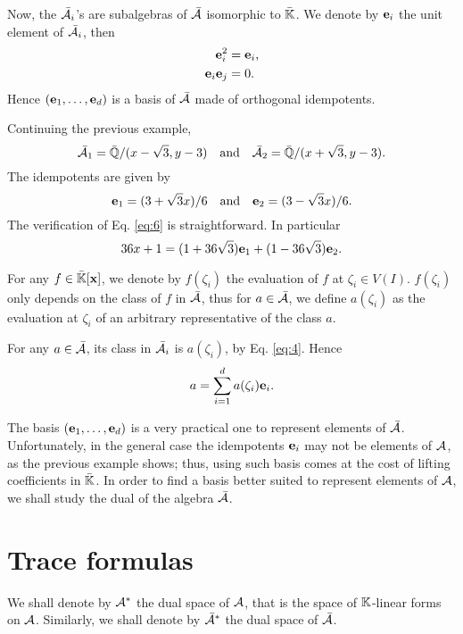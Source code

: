 Now, the $\bar{\mathcal{A}}_i$'s are subalgebras of $\bar{\mathcal{A}}$
isomorphic to $\bar{\mathbb{K}}$. We denote by $\mathbf{e}_i$ the unit element
of $\bar{\mathcal{A}}_i$, then
\begin{equation}
  \label{eq:6}
  \begin{aligned}
    \mathbf{e}_i^2 &= \mathbf{e}_i\text{,}\\
    \mathbf{e}_i\mathbf{e}_j &= 0\text{.}
  \end{aligned}
\end{equation}
Hence $(\mathbf{e}_1,\ldots,\mathbf{e}_d)$ is a basis of
$\bar{\mathcal{A}}$ made of orthogonal idempotents.

\begin{example}
  \label{ex:trace}
  Continuing the previous example, 
  \[\bar{\mathcal{A}}_1 = \bar{\mathbb{Q}}/(x-\sqrt{3},y-3)
  \quad\text{and}\quad
  \bar{\mathcal{A}}_2 = \bar{\mathbb{Q}}/(x+\sqrt{3},y-3)
  \text{.}\]
  The idempotents are given by
  \[\mathbf{e}_1 = (3+\sqrt{3}x)/6
  \quad\text{and}\quad \mathbf{e}_2 = (3-\sqrt{3}x)/6 \text{.}\] The
  verification of Eq. \eqref{eq:6} is straightforward. In particular
  \[36x + 1 = (1+36\sqrt{3})\mathbf{e}_1 + (1-36\sqrt{3})\mathbf{e}_2
  \text{.}\]
\end{example}

For any $f\in\bar{\mathbb{K}}[\mathbf{x}]$, we denote by $f(\zeta_i)$ the
evaluation of $f$ at $\zeta_i\in V(I)$. $f(\zeta_i)$ only depends on
the class of $f$ in $\mathcal{\bar{A}}$, thus for
$a\in\bar{\mathcal{A}}$, we define $a(\zeta_i)$ as the evaluation at
$\zeta_i$ of an arbitrary representative of the class $a$.

For any $a\in\bar{\mathcal{A}}$, its class in $\bar{\mathcal{A}}_i$ is $a(\zeta_i)$,
by Eq. \eqref{eq:4}. Hence
\begin{equation}
  \label{eq:2}
  a = \sum_{i=1}^da(\zeta_i)\mathbf{e}_i
  \text{.}
\end{equation}

The basis $(\mathbf{e}_1,\ldots,\mathbf{e}_d)$ is a very practical one
to represent elements of $\bar{\mathcal{A}}$. Unfortunately, in the
general case the idempotents $\mathbf{e}_i$ may not be elements of
$\mathcal{A}$, as the previous example shows; thus, using such basis
comes at the cost of lifting coefficients in $\bar{\mathbb{K}}$. In order to
find a basis better suited to represent elements of $\mathcal{A}$, we
shall study the dual of the algebra $\bar{\mathcal{A}}$.


\section{Trace formulas}
\label{sec:dual}
We shall denote by $\mathcal{A}^\ast$ the dual space of $\mathcal{A}$,
that is the space of $\mathbb{K}$-linear forms on $\mathcal{A}$. Similarly, we
shall denote by $\bar{\mathcal{A}}^\ast$ the dual space of
$\bar{\mathcal{A}}$.


